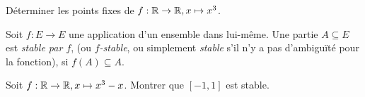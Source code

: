 \begin{exercice}
Déterminer les points fixes de $f : \mathbb{R}\to \mathbb{R}, x\mapsto x^3$.
\end{exercice}

\begin{definition}
Soit $f : E\to E$ une application d'un ensemble dans lui-même. Une partie $A\subseteq E$ est \emph{stable par $f$}, (ou \emph{$f$-stable}, ou simplement \emph{stable} s'il n'y a pas d'ambiguïté pour la fonction), si $f(A)\subseteq A$.
\end{definition}

\begin{exercice}
Soit $f : \mathbb{R}\to \mathbb{R}, x\mapsto x^3-x$. Montrer que $[-1,1]$ est stable.
\end{exercice}





